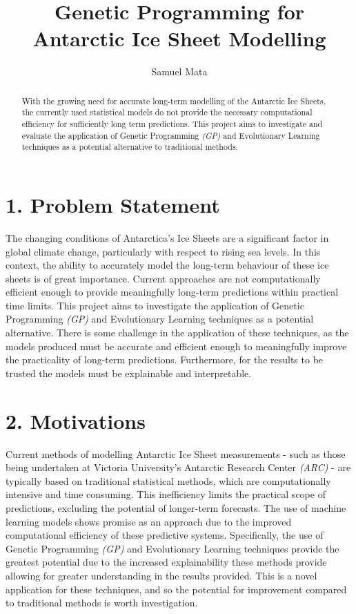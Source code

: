 \documentclass[11pt, a4paper, twoside, openright]{report}
\title{Genetic Programming for Antarctic Ice Sheet Modelling}
\author{Samuel Mata}
\date{}
\begin{document}
\frontmatter

\begin{abstract}
  With the growing need for accurate long-term modelling of
  the Antarctic Ice Sheets, the currently used statistical
  models do not provide the necessary computational 
  efficiency for sufficiently long term predictions. This
  project aims to investigate and evaluate the application
  of Genetic Programming \textit{(GP)} and Evolutionary
  Learning techniques as a potential alternative to 
  traditional methods.
\end{abstract}


\maketitle
\mainmatter


\section*{1. Problem Statement}

The changing conditions of Antarctica's Ice Sheets are a 
significant factor in global climate change, particularly
with respect to rising sea levels. In this context, the
ability to accurately model the long-term behaviour of
these ice sheets is of great importance. Current approaches
are not computationally efficient enough to provide
meaningfully long-term predictions within practical time
limits. This project aims to investigate the application of
Genetic Programming \textit{(GP)} and  Evolutionary Learning
techniques as a potential alternative. There is some
challenge in the application of these techniques, as the
models produced must be accurate and efficient enough to
meaningfully improve the practicality of long-term
predictions. Furthermore, for the results to be trusted
the models must be explainable and interpretable.


\section*{2. Motivations}

Current methods of modelling Antarctic Ice Sheet measurements 
- such as those being undertaken at Victoria University's Antarctic 
Research Center \textit{(ARC)} - are typically based on
traditional statistical methods, which are computationally
intensive and time consuming. This inefficiency limits the
practical scope of predictions, excluding the potential of
longer-term forecasts. The use of machine learning models
shows promise as an approach due to the improved 
computational efficiency of these predictive systems. 
Specifically, the use of Genetic Programming \textit{(GP)} 
and Evolutionary Learning techniques provide the 
greatest potential due to the increased explainability
these methods provide allowing for greater understanding in
the results provided. This is a novel application for
these techniques, and so the potential for improvement
compared to traditional methods is worth investigation.
\end{document}
